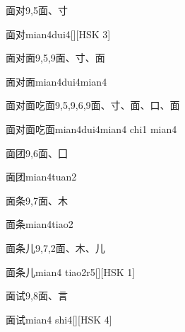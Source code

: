 \begin{entry}{面对}{9,5}{⾯、⼨}
  \begin{phonetics}{面对}{mian4dui4}[][HSK 3]
  \end{phonetics}
\end{entry}

\begin{entry}{面对面}{9,5,9}{⾯、⼨、⾯}
  \begin{phonetics}{面对面}{mian4dui4mian4}
  \end{phonetics}
\end{entry}

\begin{entry}{面对面吃面}{9,5,9,6,9}{⾯、⼨、⾯、⼝、⾯}
  \begin{phonetics}{面对面吃面}{mian4dui4mian4 chi1 mian4}
  \end{phonetics}
\end{entry}

\begin{entry}{面团}{9,6}{⾯、⼞}
  \begin{phonetics}{面团}{mian4tuan2}
  \end{phonetics}
\end{entry}

\begin{entry}{面条}{9,7}{⾯、⽊}
  \begin{phonetics}{面条}{mian4tiao2}
  \end{phonetics}
\end{entry}

\begin{entry}{面条儿}{9,7,2}{⾯、⽊、⼉}
  \begin{phonetics}{面条儿}{mian4 tiao2r5}[][HSK 1]
  \end{phonetics}
\end{entry}

\begin{entry}{面试}{9,8}{⾯、⾔}
  \begin{phonetics}{面试}{mian4 shi4}[][HSK 4]
  \end{phonetics}
\end{entry}

